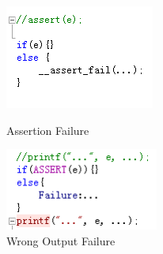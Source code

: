 \begin{figure}
\begin{minipage}[t]{0.48\linewidth}
\centering
\includegraphics[width=\textwidth]{figs/assertion.png}
\caption{Assertion Failure}
\label {AF}
\end{minipage}%
\begin{minipage}[t]{0.48\linewidth}
\centering
\includegraphics[width=\textwidth]{figs/wrong_output.png}
\caption{Wrong Output Failure}
\label{WO}
\end{minipage}
\end{figure}

